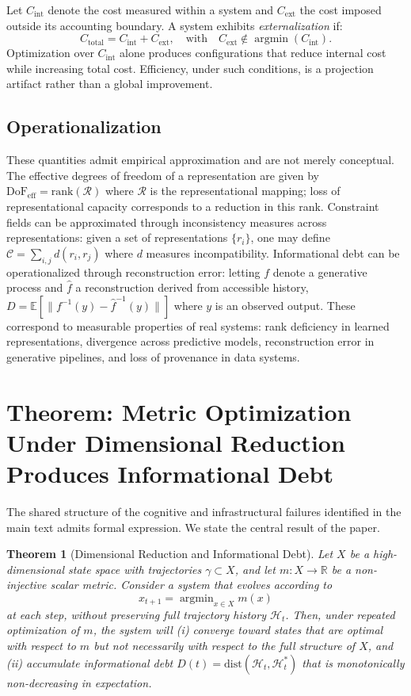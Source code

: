 \documentclass[12pt, a4paper]{article}
\newtheorem{theorem}{Theorem}
\begin{document}
Let $C_{\mathrm{int}}$ denote the cost measured within a system and $C_{\mathrm{ext}}$ the cost imposed outside its accounting boundary. A system exhibits \emph{externalization} if:
\[
C_{\mathrm{total}} = C_{\mathrm{int}} + C_{\mathrm{ext}}, \quad \text{with} \quad C_{\mathrm{ext}} \notin \operatorname{argmin}(C_{\mathrm{int}}).
\]
Optimization over $C_{\mathrm{int}}$ alone produces configurations that reduce internal cost while increasing total cost. Efficiency, under such conditions, is a projection artifact rather than a global improvement.

\subsection*{Operationalization}

These quantities admit empirical approximation and are not merely conceptual. The effective degrees of freedom of a representation are given by $\mathrm{DoF}_{\mathrm{eff}} = \mathrm{rank}(\mathcal{R})$ where $\mathcal{R}$ is the representational mapping; loss of representational capacity corresponds to a reduction in this rank. Constraint fields can be approximated through inconsistency measures across representations: given a set of representations $\{r_i\}$, one may define $\mathcal{C} = \sum_{i,j} d(r_i, r_j)$ where $d$ measures incompatibility. Informational debt can be operationalized through reconstruction error: letting $f$ denote a generative process and $\hat{f}$ a reconstruction derived from accessible history, $D = \mathbb{E}[\|f^{-1}(y) - \hat{f}^{-1}(y)\|]$ where $y$ is an observed output. These correspond to measurable properties of real systems: rank deficiency in learned representations, divergence across predictive models, reconstruction error in generative pipelines, and loss of provenance in data systems.

\section{Theorem: Metric Optimization Under Dimensional Reduction Produces Informational Debt}

The shared structure of the cognitive and infrastructural failures identified in the main text admits formal expression. We state the central result of the paper.

\begin{theorem}[Dimensional Reduction and Informational Debt]
Let $X$ be a high-dimensional state space with trajectories $\gamma \subset X$, and let $m \colon X \to \mathbb{R}$ be a non-injective scalar metric. Consider a system that evolves according to
\[
x_{t+1} = \operatorname{argmin}_{x \in X} m(x)
\]
at each step, without preserving full trajectory history $\mathcal{H}_t$. Then, under repeated optimization of $m$, the system will \textup{(i)} converge toward states that are optimal with respect to $m$ but not necessarily with respect to the full structure of $X$, and \textup{(ii)} accumulate informational debt $D(t) = \mathrm{dist}(\mathcal{H}_t, \mathcal{H}_t^*)$ that is monotonically non-decreasing in expectation.
\end{theorem}
\end{document}
